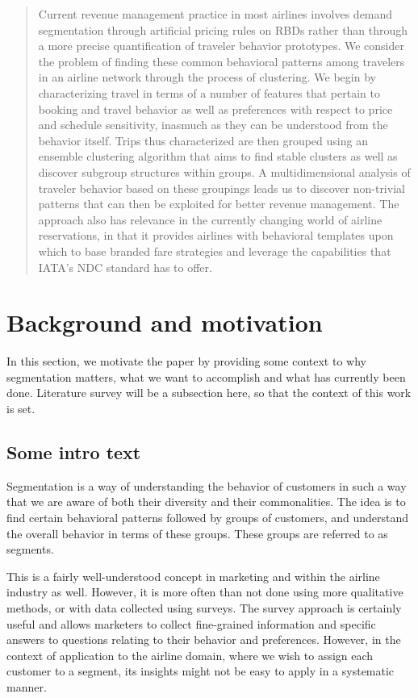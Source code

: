\begin{abstract}
Current revenue management practice in most airlines involves demand segmentation through artificial pricing rules on RBDs rather than through a more precise quantification of traveler behavior prototypes. We consider the problem of finding these common behavioral patterns among travelers in an airline network through the process of clustering. We begin by characterizing travel in terms of a number of features that pertain to booking and travel behavior as well as preferences with respect to price and schedule sensitivity, inasmuch as they can be understood from the behavior itself. Trips thus characterized are then grouped using an ensemble clustering algorithm that aims to find stable clusters as well as discover subgroup structures within groups. A multidimensional analysis of traveler behavior based on these groupings leads us to discover non-trivial patterns that can then be exploited for better revenue management. The approach also has relevance in the currently changing world of airline reservations, in that it provides airlines with behavioral templates upon which to base branded fare strategies and leverage the capabilities that IATA’s NDC standard has to offer.
\end{abstract}

\section{Background and motivation}
\label{sec:intro}

In this section, we motivate the paper by providing some context to why segmentation matters, what we want to accomplish and what has currently been done. Literature survey will be a subsection here, so that the context of this work is set.

\subsection{Some intro text}

Segmentation is a way of understanding the behavior of customers in such a way that we are aware of both their diversity and their commonalities. The idea is to find certain behavioral patterns followed by groups of customers, and understand the overall behavior in terms of these groups. These groups are referred to as segments. 

This is a fairly well-understood concept in marketing and within the airline industry as well. However, it is more often than not done using more qualitative methods, or with data collected using surveys. The survey approach is certainly useful and allows marketers to collect fine-grained information and specific answers to questions relating to their behavior and preferences. However, in the context of application to the airline domain, where we wish to assign each customer to a segment, its insights might not be easy to apply in a systematic manner. 

